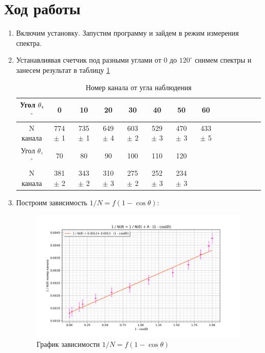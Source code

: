 \documentclass[a4paper]{article}
\begin{document}
\section{Ход работы}

\begin{enumerate}
    \item Включим установку. Запустим программу и зайдем в режим измерения спектра.
    \item Устанавлиявая счетчик под разными углами от 0 до $120^{\circ}$ снимем спектры и занесем результат в таблицу \ref{table}

    \begin{table}[H]
        \centering
        \begin{center}
        \caption{Номер канала от угла наблюдения}
        \end{center}
        \vspace{0.1cm}
        \label{table}
        \begin{tabular}{ |c|c|c|c|c|c|c|c|c|c|c|c|c|c|}
    \hline
       Угол $\theta$,$^{\circ}$ & 0 & 10 & 20&30&40&50&60 \\
     \hline 
        N канала&774 $\pm$ 1&735 $\pm$ 1&649 $\pm$ 4&603 $\pm$ 2&529 $\pm$ 3&470 $\pm$ 3&433 $\pm$ 5\\
    \hline
       Угол $\theta$,$^{\circ}$ & 70&80&90&100&110&120& \\
     \hline 
        N канала&381 $\pm$ 2&343 $\pm$ 2&310 $\pm$ 3&275 $\pm$ 2&252 $\pm$ 3&234 $\pm$ 3&\\
    \hline
    \end{tabular}
    \end{table}

    \item Построим зависимость $1/N = f(1 - \cos{\theta})$:

    \begin{figure}[H]
        \begin{center}
        \includegraphics[scale = 0.6]{plot.png}
        \caption{График зависимости $1/N = f(1 - \cos{\theta})$}
        \label{plot}
        \end{center}
    \end{figure}


\end{enumerate}
\end{document}
